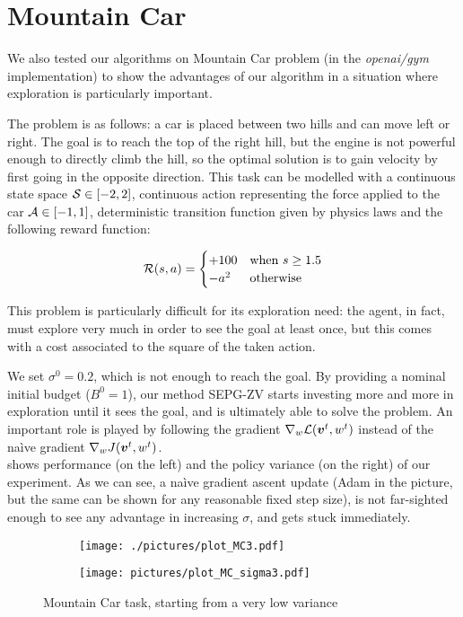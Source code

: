 \section{Mountain Car}\label{sec:mountain}

We also tested our algorithms on Mountain Car problem (in the \textit{openai/gym} implementation) to show the advantages of our algorithm in a situation where exploration is particularly important. 


The problem is as follows: a car is placed between two hills and can move left or right. The goal is to reach the top of the right hill, but the engine is not powerful enough to directly climb the hill, so the optimal solution is to gain velocity by first going in the opposite direction. This task can be modelled with a continuous state space $\mathcal{S} \in [-2, 2]$, continuous action representing the force applied to the car $\mathcal{A} \in [-1, 1]$, deterministic transition function given by physics laws and the following reward function:

\begin{equation*}
\mathcal{R}(s,a) = \begin{cases} +100 & \textrm{when } s \geq 1.5 \\ -a^2 & \textrm{otherwise} \end{cases}
\end{equation*}

This problem is particularly difficult for its exploration need: the agent, in fact, must explore very much in order to see the goal at least once, but this comes with a cost associated to the square of the taken action.


We set $\sigma^0 = 0.2$, which is not enough to reach the goal. By providing a nominal initial budget ($B^0 = 1$), our method SEPG-ZV starts investing more and more in exploration until it sees the goal, and is ultimately able to solve the problem. An important role is played by following the gradient $ \nabla_{w}\mathcal{L}(\boldsymbol{v}^t, w^t)$ instead of the na\`ive gradient $\nabla_w J(\boldsymbol{v}^t, w^t)$. \\
 shows performance (on the left) and the policy variance (on the right) of our experiment. As we can see, a na\`ive gradient ascent update (Adam in the picture, but the same can be shown for any reasonable fixed step size), is not far-sighted enough to see any advantage in increasing $\sigma$, and gets stuck immediately. 


\begin{figure}[t]
\centering
\begin{subfigure}[t]{0.49\textwidth}
\texttt{[image: ./pictures/plot\_MC3.pdf]}
\end{subfigure}
\begin{subfigure}[t]{0.49\textwidth}
\texttt{[image: pictures/plot\_MC\_sigma3.pdf]}
\end{subfigure}
\caption{Mountain Car task, starting from a very low variance}\label{fig:mc}
\end{figure}






